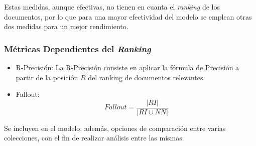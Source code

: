 Estas medidas, aunque efectivas, no tienen en cuanta el \emph{ranking} de los
documentos, por lo que para una mayor efectividad del modelo se emplean otras
dos medidas para un mejor rendimiento.

\subsubsection{Métricas Dependientes del \emph{Ranking}}

\begin{itemize}
    \item R-Precisión:
    La R-Precisión consiste en aplicar la fórmula de Precisión a partir de la
    posición $R$ del ranking de documentos relevantes.\\
    \item Fallout:
        $$Fallout = \dfrac{|RI|}{|RI\cup NN|}$$
\end{itemize}

Se incluyen en el modelo, además, opciones de comparación entre varias
colecciones, con el fin de realizar análisis entre las mismas.